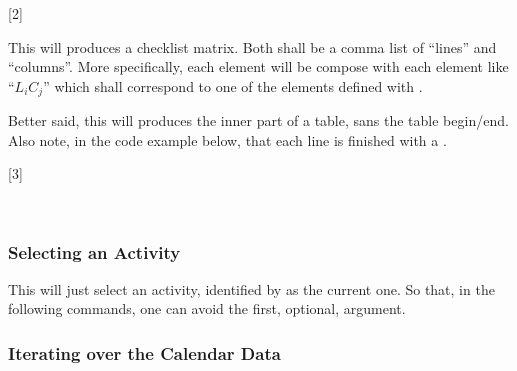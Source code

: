 \documentclass[10pt]{article}
\begin{document}
[2]


\begin{codedescribe}{\StudentCheckListTable}
\begin{codesyntax}
\end{codesyntax}
  This will produces a checklist matrix. Both  shall be a comma list of ``lines'' and ``columns''. More specifically, each  element will be compose with each  element like ``$L_iC_j$'' which shall correspond to one of the  elements defined with \tsobj{\checkdef}.
\end{codedescribe}
\begin{tsremark}
  Better said, this will produces the inner part of a table, sans the table begin/end. Also note, in the code example below, that each line is finished with a \tsobj[verb]{\\*}.
\end{tsremark}

[3]




~

\subsubsection{Selecting an Activity}

\begin{codedescribe}{\ActivitySelect}
  \begin{codesyntax}
  \end{codesyntax}
  This will just select an activity, identified by  as the current one. So that, in the following commands, one can avoid the first, optional, argument.
\end{codedescribe}





\subsubsection{Iterating over the Calendar Data}
\end{document}
